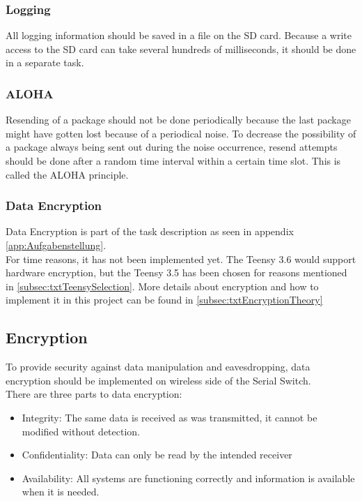 \subsubsection{Logging}
All logging information should be saved in a file on the SD card. Because a write access to the SD card can take several hundreds of milliseconds, it should be done in a separate task.
%
\subsubsection{ALOHA}
Resending of a package should not be done periodically because the last package might have gotten lost because of a periodical noise. To decrease the possibility of a package always being sent out during the noise occurrence, resend attempts should be done after a random time interval within a certain time slot. This is called the ALOHA principle.
%
%
\subsubsection{Data Encryption}
Data Encryption is part of the task description as seen in appendix \autoref{app:Aufgabenstellung}.\\
For time reasons, it has not been implemented yet. The Teensy 3.6 would support hardware encryption, but the Teensy 3.5 has been chosen for reasons mentioned in \autoref{subsec:txtTeensySelection}. More details about encryption and how to implement it in this project can be found in \autoref{subsec:txtEncryptionTheory}
%
%
%
%
\subsection{Encryption} \label{subsec:txtEncryptionTheory}
To provide security against data manipulation and eavesdropping, data encryption should be implemented on wireless side of the Serial Switch.\\
There are three parts to data encryption:
\begin{itemize}
    \item Integrity: The same data is received as was transmitted, it cannot be modified without detection.
    \item Confidentiality: Data can only be read by the intended receiver
    \item Availability: All systems are functioning correctly and information is available when it is needed.
\end{itemize}
%
